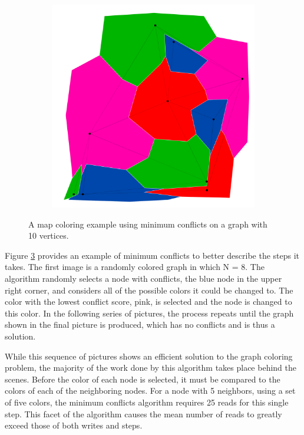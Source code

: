 \documentclass{article}
\begin{document}
\begin{figure}[h!]
\begin{subfigure}{0.18\textwidth}
				\caption{}
				\label{mind}
			\end{subfigure}
			\;
			\begin{subfigure}{0.18\textwidth}
				\centering
				\includegraphics[width=\textwidth]{images/sequences/min/minconf_I00007}
				\caption{}
				\label{mine}
			\end{subfigure} 

			\caption{A map coloring example using minimum conflicts on a graph with 10 vertices.}
			\label{min_ex}
		\end{figure}

		Figure \ref{min_ex} provides an example of minimum conflicts to better describe the steps it takes.  The first image is a randomly colored graph in which N = 8.  The algorithm randomly selects a node with conflicts, the blue node in the upper right corner, and considers all of the possible colors it could be changed to.  The color with the lowest conflict score, pink, is selected and the node is changed to this color.  In the following series of pictures, the process repeats until the graph shown in the final picture is produced, which has no conflicts and is thus a solution.
		
		While this sequence of pictures shows an efficient solution to the graph coloring problem, the majority of the work done by this algorithm takes place behind the scenes.  Before the color of each node is selected, it must be compared to the colors of each of the neighboring nodes.  For a node with 5 neighbors, using a set of five colors, the minimum conflicts algorithm requires 25 reads for this single step.  This facet of the algorithm causes the mean number of reads to greatly exceed those of both writes and steps.
\end{document}
